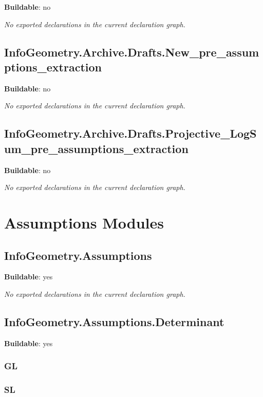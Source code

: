 \noindent\textbf{Buildable}: no

\noindent\emph{No exported declarations in the current declaration graph.}

\section{InfoGeometry.Archive.Drafts.New_pre_assumptions_extraction}

\noindent\textbf{Buildable}: no

\noindent\emph{No exported declarations in the current declaration graph.}

\section{InfoGeometry.Archive.Drafts.Projective_LogSum_pre_assumptions_extraction}

\noindent\textbf{Buildable}: no

\noindent\emph{No exported declarations in the current declaration graph.}

\chapter{Assumptions Modules}

\section{InfoGeometry.Assumptions}

\noindent\textbf{Buildable}: yes

\noindent\emph{No exported declarations in the current declaration graph.}

\section{InfoGeometry.Assumptions.Determinant}

\noindent\textbf{Buildable}: yes

\subsection*{GL}

\begin{theorem}[blueprint="infogeometry:assumptions:determinant:gl"]
\end{theorem}

\subsection*{SL}

